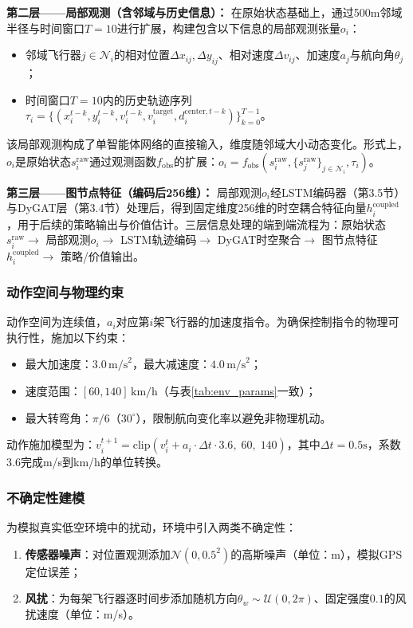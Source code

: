 \documentclass[12pt,a4paper,UTF8]{ctexart}
\begin{document}
\textbf{第二层——局部观测（含邻域与历史信息）：}
在原始状态基础上，通过500m邻域半径与时间窗口$T=10$进行扩展，构建包含以下信息的局部观测张量$o_i$：
\begin{itemize}
    \item 邻域飞行器$j \in \mathcal{N}_i$的相对位置$\Delta x_{ij}, \Delta y_{ij}$、相对速度$\Delta v_{ij}$、加速度$a_j$与航向角$\theta_j$；
    \item 时间窗口$T=10$内的历史轨迹序列$\tau_i = \{(x_i^{t-k}, y_i^{t-k}, v_i^{t-k}, v_i^{\text{target}}, d_i^{\text{center}, t-k})\}_{k=0}^{T-1}$。
\end{itemize}
该局部观测构成了单智能体网络的直接输入，维度随邻域大小动态变化。形式上，$o_i$是原始状态$s_i^{\text{raw}}$通过观测函数$f_{\text{obs}}$的扩展：$o_i = f_{\text{obs}}(s_i^{\text{raw}}, \{s_j^{\text{raw}}\}_{j \in \mathcal{N}_i}, \tau_i)$。

\textbf{第三层——图节点特征（编码后256维）：}
局部观测$o_i$经LSTM编码器（第3.5节）与DyGAT层（第3.4节）处理后，得到固定维度256维的时空耦合特征向量$h_i^{\text{coupled}}$，用于后续的策略输出与价值估计。三层信息处理的端到端流程为：原始状态$s_i^{\text{raw}} \to$ 局部观测$o_i \to$ LSTM轨迹编码$\to$ DyGAT时空聚合$\to$ 图节点特征$h_i^{\text{coupled}} \to$ 策略/价值输出。

\subsubsection{动作空间与物理约束}

动作空间为连续值，$a_i$对应第$i$架飞行器的加速度指令。为确保控制指令的物理可执行性，施加以下约束：
\begin{itemize}
    \item 最大加速度：$3.0\,\text{m/s}^2$，最大减速度：$4.0\,\text{m/s}^2$；
    \item 速度范围：$[60, 140]\,\text{km/h}$（与表\ref{tab:env_params}一致）；
    \item 最大转弯角：$\pi/6$（$30^\circ$），限制航向变化率以避免非物理机动。
\end{itemize}

动作施加模型为：$v_i^{t+1} = \text{clip}(v_i^{t} + a_i \cdot \Delta t \cdot 3.6,\; 60,\; 140)$，其中$\Delta t = 0.5\text{s}$，系数3.6完成m/s到km/h的单位转换。

\subsubsection{不确定性建模}

为模拟真实低空环境中的扰动，环境中引入两类不确定性：
\begin{enumerate}[label=(\arabic*)]
    \item \textbf{传感器噪声}：对位置观测添加$\mathcal{N}(0, 0.5^2)$的高斯噪声（单位：m），模拟GPS定位误差；
    \item \textbf{风扰}：为每架飞行器逐时间步添加随机方向$\theta_w \sim \mathcal{U}(0, 2\pi)$、固定强度$0.1$的风扰速度（单位：m/s）。
\end{enumerate}
\end{document}

